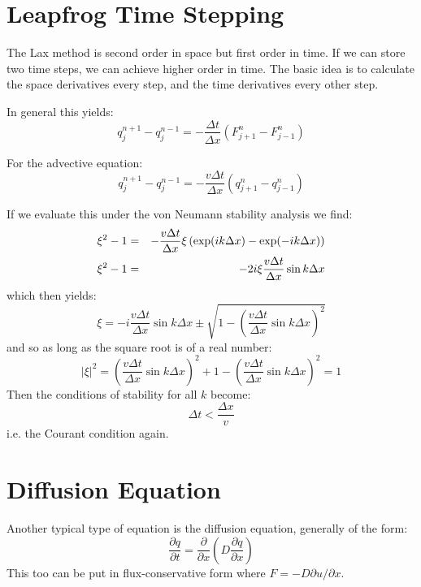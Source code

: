 \section{Leapfrog Time Stepping}

The Lax method is second order in space but first order in time. If we
can store two time steps, we can achieve higher order in time. The
basic idea is to calculate the space derivatives every step, and the
time derivatives every other step. 

In general this yields:
\begin{equation}
q_j^{n+1} - q_j^{n-1} = - \frac{\Delta t}{\Delta x} \left(F_{j+1}^n -
F_{j-1}^n\right)
\end{equation}

For the advective equation:
\begin{equation}
q_j^{n+1} - q_j^{n-1} = - \frac{ v \Delta t}{\Delta x} \left(q_{j+1}^n
- q_{j-1}^n\right)
\end{equation}

If we evaluate this under the von Neumann stability analysis we find:
\begin{eqnarray}
\xi^2 - 1 &=& - \frac{v \Delta t}{\Delta x} \xi \left(\exp(i k \Delta x)
- \exp(- i k \Delta x) \right) \cr
\xi^2 - 1 &=& - 2i \xi \frac{v \Delta t}{\Delta x} \sin k\Delta x 
\end{eqnarray}
which then yields:
\begin{equation}
\xi = - i \frac{v \Delta t}{\Delta x} \sin k\Delta x \pm
\sqrt{1 - \left(\frac{v \Delta t}{\Delta x} \sin k\Delta x \right)^2}
\end{equation}
and so as long as the square root is of a real number:
\begin{equation}
|\xi|^2 = \left(\frac{v \Delta t}{\Delta x} \sin k\Delta x \right)^2 +
 1 - \left(\frac{v \Delta t}{\Delta x} \sin k\Delta x \right)^2 = 1
\end{equation}
Then the conditions of stability for all $k$ become:
\begin{equation}
\Delta t < \frac{\Delta x}{v}
\end{equation}
i.e. the Courant condition again.

\section{Diffusion Equation}

Another typical type of equation is the diffusion equation, generally
of the form:
\begin{equation}
\frac{\partial q}{\partial t} = \frac{\partial}{\partial
x} \left(D \frac{\partial q}{\partial x}\right)
\end{equation}
This too can be put in flux-conservative form where $F = -D \partial
u/\partial x$. 

